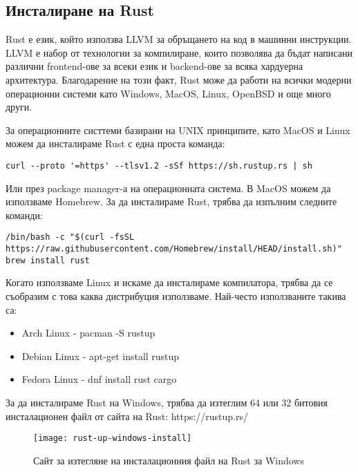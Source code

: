 \subsection{Инсталиране на Rust}
Rust е език, който използва LLVM за обръщането на код в машинни инструкции.
LLVM е набор от технологии за компилиране, които позволява да бъдат написани
различни frontend-ове за всеки език и backend-ове за всяка хардуерна архитектура.
Благодарение на този факт, Rust може да работи на всички модерни операционни системи
като Windows, MacOS, Linux, OpenBSD и още много други.

За операционните систтеми базирани на UNIX принципите, като MacOS и Linux можем
да инсталираме Rust с една проста команда:
\begin{lstlisting}
curl --proto '=https' --tlsv1.2 -sSf https://sh.rustup.rs | sh
\end{lstlisting}

Или през package manager-а на операционната система.
В MacOS можем да използваме Homebrew. За да инсталираме Rust, трябва да изпълним следните команди:
\begin{lstlisting}
/bin/bash -c "$(curl -fsSL https://raw.githubusercontent.com/Homebrew/install/HEAD/install.sh)"
brew install rust
\end{lstlisting}

Когато използваме Linux и искаме да инсталираме компилатора, трябва да се
съобразим с това каква дистрибуция използваме. Най-често използваните такива
са: \begin{itemize}
\item Arch Linux - pacman -S rustup
\item Debian Linux - apt-get install rustup
\item Fedora Linux - dnf install rust cargo
\end{itemize}

За да инсталираме Rust на Windows, трябва да изтеглим 64 или 32 битовия
инсталационен файл от сайта на Rust: https://rustup.rs/

\begin{figure}[!htb]
  \texttt{[image: rust-up-windows-install]}
  \centering
  \caption{Сайт за изтегляне на инсталационния файл на Rust за Windows}
  \label{fig:rust-up-windows-install}
\end{figure}
